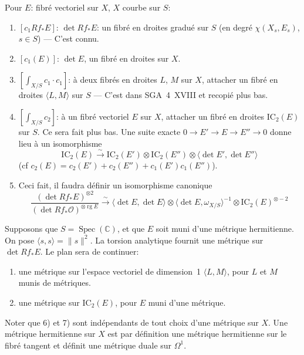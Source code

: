 \documentclass[11pt,a4paper]{article}
\theoremstyle{plain}
\theoremstyle{definition}
\DeclareMathOperator{\Spec}{Spec}
\DeclareMathOperator{\rg}{rg}
\newcommand{\IC}{\mathrm{IC}}
\newcommand{\C}{\mathbb{C}}
\newcommand{\cO}{\mathcal{O}}
\begin{document}
Pour $E$: fibr\'e vectoriel sur $X$, $X$ courbe sur $S$:

\begin{enumerate}
\item $[c_1 Rf_* E]$: $\det Rf_* E$: un fibr\'e en droites gradu\'e sur $S$ (en degr\'e $\chi(X_s, E_s)$, $s \in S$) --- C'est connu.

\item $[c_1(E)]$: $\det E$, un fibr\'e en droites sur $X$.

\item $\left[\int_{X/S} c_1 \cdot c_1\right]$: \`a deux fibr\'es en droites $L$, $M$ sur $X$, attacher un fibr\'e en droites $\langle L, M \rangle$ sur $S$ --- C'est dans SGA~4~XVIII et recopi\'e plus bas.

\item $\left[\int_{X/S} c_2\right]$: \`a un fibr\'e vectoriel $E$ sur $X$, attacher un fibr\'e en droites $\IC_2(E)$ sur $S$. Ce sera fait plus bas. Une suite exacte $0 \to E' \to E \to E'' \to 0$ donne lieu \`a un isomorphisme
\begin{equation}
\IC_2(E) \xrightarrow{\sim} \IC_2(E') \otimes \IC_2(E'') \otimes \langle \det E', \det E'' \rangle
\end{equation}
(cf $c_2(E) = c_2(E') + c_2(E'') + c_1(E')c_1(E'')$).

\item Ceci fait, il faudra d\'efinir un isomorphisme canonique
\begin{equation}
\frac{(\det Rf_* E)^{\otimes 2}}{(\det Rf_* \cO)^{\otimes \rg E}} \xrightarrow{\sim} \langle \det E, \det E \rangle \otimes \langle \det E, \omega_{X/S} \rangle^{-1} \otimes \IC_2(E)^{\otimes -2}
\end{equation}
\end{enumerate}

Supposons que $S = \Spec(\C)$, et que $E$ soit muni d'une m\'etrique hermitienne. On pose $\langle s, s \rangle = \|s\|^2$. La torsion analytique fournit une m\'etrique sur $\det Rf_* E$. Le plan sera de continuer:
\begin{enumerate}
\item[6)] une m\'etrique sur l'espace vectoriel de dimension~1 $\langle L, M \rangle$, pour $L$ et $M$ munis de m\'etriques.
\item[7)] une m\'etrique sur $\IC_2(E)$, pour $E$ muni d'une m\'etrique.
\end{enumerate}

Noter que 6) et 7) sont ind\'ependants de tout choix d'une m\'etrique sur $X$. Une m\'etrique hermitienne sur $X$ est par d\'efinition une m\'etrique hermitienne sur le fibr\'e tangent et d\'efinit une m\'etrique duale sur $\Omega^1$.
\end{document}
